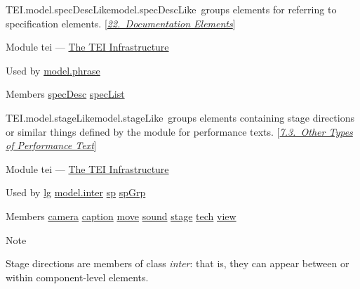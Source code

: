 \begin{reflist}
\item[]\begin{specHead}{TEI.model.specDescLike}{model.specDescLike} groups elements for referring to specification elements. [\textit{\hyperref[TD]{22.\ Documentation Elements}}]\end{specHead} 
    \item[{Module}]
  tei — \hyperref[ST]{The TEI Infrastructure}
    \item[{Used by}]
  \hyperref[TEI.model.phrase]{model.phrase}
    \item[{Members}]
  \hyperref[TEI.specDesc]{specDesc} \hyperref[TEI.specList]{specList}
\end{reflist}  
\begin{reflist}
\item[]\begin{specHead}{TEI.model.stageLike}{model.stageLike} groups elements containing stage directions or similar things defined by the module for performance texts. [\textit{\hyperref[DROTH]{7.3.\ Other Types of Performance Text}}]\end{specHead} 
    \item[{Module}]
  tei — \hyperref[ST]{The TEI Infrastructure}
    \item[{Used by}]
  \hyperref[TEI.lg]{lg} \hyperref[TEI.model.inter]{model.inter} \hyperref[TEI.sp]{sp} \hyperref[TEI.spGrp]{spGrp}
    \item[{Members}]
  \hyperref[TEI.camera]{camera} \hyperref[TEI.caption]{caption} \hyperref[TEI.move]{move} \hyperref[TEI.sound]{sound} \hyperref[TEI.stage]{stage} \hyperref[TEI.tech]{tech} \hyperref[TEI.view]{view}
    \item[{Note}]
  \par
Stage directions are members of class \textit{inter}: that is, they can appear between or within component-level elements.
\end{reflist}  
